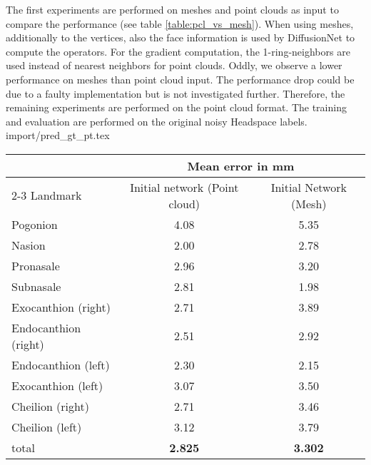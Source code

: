\documentclass[class=article, crop=false]{standalone}
\begin{document}
The first experiments are performed on meshes and point clouds as input to compare the performance (see table \ref{table:pcl_vs_mesh}). When using meshes, additionally to the vertices, also the face information is used by DiffusionNet to compute the operators. For the gradient computation, the 1-ring-neighbors are used instead of nearest neighbors for point clouds. Oddly, we observe a lower performance on meshes than point cloud input. The performance drop could be due to a faulty implementation but is not investigated further. Therefore, the remaining experiments are performed on the point cloud format. The training and evaluation are performed on the original noisy Headspace labels.
{import/pred_gt_pt.tex}
\begin{table*}[!htbp]
\label{table:pcl_vs_mesh}
\begin{tabularx}{\textwidth}{l|c|c}
\toprule
 & \multicolumn{2}{c}{Mean error in mm} \\\cmidrule(lr){2-3}
Landmark               & \hspace{0.3cm} Initial network (Point cloud) \hspace{0.3cm}  &  \hspace{0.3cm} Initial Network (Mesh) \hspace{0.3cm}      
\\
\midrule
Pogonion               & 4.08       & 5.35                                                                        \\
Nasion                 & 2.00       & 2.78  \\ %
Pronasale              & 2.96       & 3.20 \\
Subnasale              & 2.81       & 1.98 \\
Exocanthion (right)    & 2.71       & 3.89 \\
Endocanthion (right)   & 2.51       & 2.92 \\
Endocanthion (left)    & 2.30       & 2.15 \\
Exocanthion (left)     & 3.07       & 3.50\\
Cheilion (right)       & 2.71       & 3.46 \\
Cheilion (left)        & 3.12       & 3.79 \\
\bottomrule
total & \textbf{2.825} & \textbf{3.302} 
\end{tabularx}
\end{table*}
\end{document}
